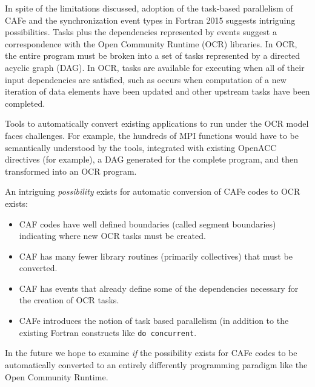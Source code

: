 In spite of the limitations discussed, 
adoption of the task-based parallelism of CAFe and the synchronization
event types in Fortran 2015 suggests intriguing possibilities.  Tasks plus the
dependencies represented by events suggest a correspondence with the Open Community
Runtime (OCR) libraries.  In OCR, the entire program must be broken into a set of tasks
represented by a directed acyclic graph (DAG).  In OCR, tasks are available for executing
when all of their input dependencies are satisfied, such as occurs when computation of a new
iteration of data elements have been updated and other upstream tasks have been completed.

Tools to automatically convert existing applications to run under the OCR model faces challenges.  For
example, the hundreds of MPI functions would have to be semantically understood by the tools,
integrated with existing OpenACC directives (for example), a DAG generated for the complete
program, and then transformed into an OCR program.

An intriguing \emph{possibility} exists for automatic conversion of CAFe codes to OCR exists:
\begin{itemize}
\item
  CAF codes have well defined boundaries (called segment boundaries) indicating where new
  OCR tasks must be created.
\item
  CAF has many fewer library routines (primarily collectives) that must be converted.
\item
  CAF has events that already define some of the dependencies necessary for the creation
  of OCR tasks.
\item
  CAFe introduces the notion of task based parallelism (in addition to the existing
  Fortran constructs like \texttt{do concurrent}.
\end{itemize}

In the future we hope to examine \emph{if} the possibility exists for CAFe codes to be
automatically converted to an entirely differently programming paradigm like
the Open Community Runtime.

\begin{comment}
These choices often hide the opportunity for
optimizations by the compiler \cite{Dubey:2014:SSC:2686745.2686756}.
\end{comment}

